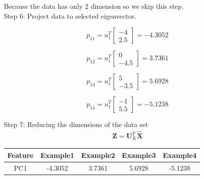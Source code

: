\documentclass[a4paper, 12pt]{report}
\begin{document}
\indent Because the data has only 2 dimension so we skip this step.\\
\indent Step 6: Project data to selected eigenvector.

$$  p_{11} = u_1^T\begin{bmatrix} -4\\ 2.5 \end{bmatrix} =-4.3052$$

$$  p_{12} = u_1^T\begin{bmatrix} 0\\ -4.5 \end{bmatrix} =3.7361$$

$$  p_{13} = u_1^T\begin{bmatrix} 5\\ -3.5 \end{bmatrix} =5.6928$$

$$  p_{14} = u_1^T\begin{bmatrix} -1\\ 5.5 \end{bmatrix} =-5.1238$$


\indent Step 7: Reducing the dimensions of the data set
\begin{eqnarray*}
\mathbf{Z} = \mathbf{U}_K^T\hat{\mathbf{X}}
\end{eqnarray*}
\begin{center}
 \begin{tabular}{||c|c|c|c|c||} 
 \hline
 Feature & Example1 & Example2 & Example3 & Example4 \\ [0.5ex] 
 \hline
 PC1 & -4.3052 & 3.7361&5.6928 & -5.1238 \\ 
\hline

\end{tabular}
\end{center}
\end{document}
